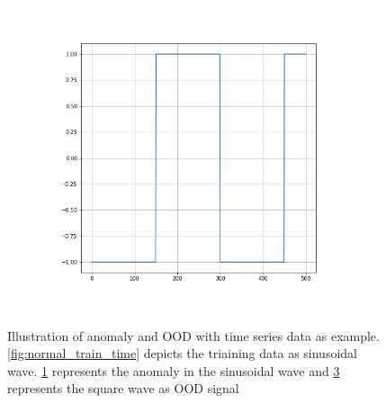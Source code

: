 \begin{figure}[h!]
\begin{subfigure}{0.333\textwidth}
        \caption{}
        \label{fig:anomaly_time}
    \end{subfigure}
    \begin{subfigure}{0.333\textwidth}
        \centering
        \includegraphics[height=0.3\textheight,width=0.98\textwidth]{images/intro_ood_anomaly/ood_train.png}
        \caption{}
        \label{fig:ood_time}
    \end{subfigure}
    \caption{Illustration of anomaly and OOD with time series data as example. \ref{fig:normal_train_time} depicts the triaining data as sinusoidal wave.
    \ref{fig:anomaly_time} represents the anomaly in the sinusoidal wave and \ref{fig:ood_time} represents the square wave as OOD signal}
\end{figure}
